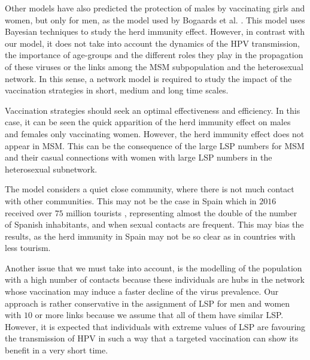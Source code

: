 Other models have also predicted the protection of males by vaccinating girls and women, but only for men, as the model used by Bogaards et al. \cite{bogaards2015direct}. This model uses Bayesian techniques to study the herd immunity effect. However, in contrast with our model, it does not take into account the dynamics of the HPV transmission, the importance of age-groups and the different roles they play in the propagation of these viruses or the links among the MSM subpopulation and the heterosexual network. In this sense, a network model is required to study the impact of the vaccination strategies in short, medium and long time scales.

Vaccination strategies should seek an optimal effectiveness and efficiency. In this case, it can be seen the quick apparition of the herd immunity effect on males and females only vaccinating women. However, the herd immunity effect does not appear in  MSM. This can be the consequence of the large LSP numbers for MSM and their casual connections with women with large LSP numbers in the heterosexual subnetwork.

The model considers a quiet close community, where there is not much contact with other communities. This may not be the case in Spain which in $2016$ received over $75$ million tourists \cite{INEturismo}, representing almost the double of the number of Spanish inhabitants, and when sexual contacts are frequent. This may bias the results, as the herd immunity in Spain may not be so clear as in countries with less tourism.

Another issue that we must take into account, is the modelling of the population with a high number of contacts because these individuals are hubs in the network whose vaccination may induce a faster decline of the virus prevalence. Our approach is rather conservative in the assignment of LSP for men and women with $10$ or more links because we assume that all of them have similar LSP. However, it is expected that individuals with extreme values of LSP are favouring the transmission of HPV in such a way that  a targeted vaccination can show its benefit in a very short time.
